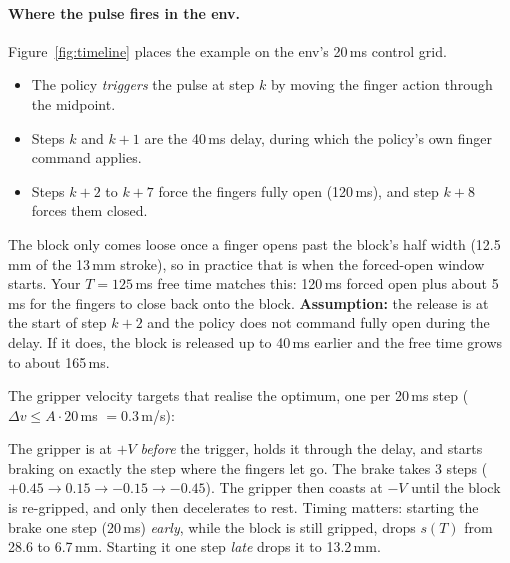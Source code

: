 \paragraph{Where the pulse fires in the env.}
Figure~\ref{fig:timeline} places the example on the env's 20\,ms control grid.
\begin{itemize}
  \item The policy \emph{triggers} the pulse at step $k$ by moving the finger action through the midpoint.
  \item Steps $k$ and $k+1$ are the 40\,ms delay, during which the policy's own finger command applies.
  \item Steps $k+2$ to $k+7$ force the fingers fully open (120\,ms), and step $k+8$ forces them closed.
\end{itemize}
The block only comes loose once a finger opens past the block's half width (12.5\,mm of the 13\,mm stroke), so in
practice that is when the forced-open window starts. Your $T=125$\,ms free time matches this: 120\,ms forced open
plus about 5\,ms for the fingers to close back onto the block. \textbf{Assumption:} the release is at the start of
step $k+2$ and the policy does not command fully open during the delay. If it does, the block is released up to
40\,ms earlier and the free time grows to about 165\,ms.

The gripper velocity targets that realise the optimum, one per 20\,ms step ($\Delta v\le A\cdot20$\,ms $=0.3$\,m/s):
\begin{center}
\small
{}
\end{center}
The gripper is at $+V$ \emph{before} the trigger, holds it through the delay, and starts braking on exactly the step
where the fingers let go. The brake takes 3 steps ($+0.45\to0.15\to-0.15\to-0.45$). The gripper then coasts at $-V$
until the block is re-gripped, and only then decelerates to rest. Timing matters: starting the brake one step
(20\,ms) \emph{early}, while the block is still gripped, drops $s(T)$ from 28.6 to 6.7\,mm. Starting it one step
\emph{late} drops it to 13.2\,mm.

